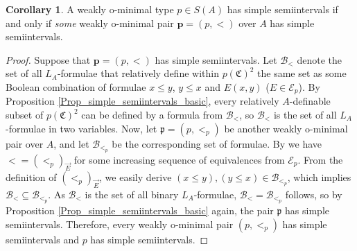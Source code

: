 \documentclass{amsart}
\theoremstyle{definition}
\newtheorem{Corollary}[Theorem]{Corollary}
\theoremstyle{definition}
\newcommand{\Mon}{\mathfrak C}
\begin{document}
\begin{Corollary}\label{COr_simple_semiint_ind_of order}
A weakly o-minimal type $p\in S(A)$ has simple semiintervals if and only if    {\it some} weakly o-minimal pair $\mathbf p=(p,<)$ over $A$ has simple semiintervals. 
\end{Corollary}
\begin{proof}Suppose that $\mathbf p=(p,<)$ has simple semiintervals. Let $\mathcal B_{<}$ denote the set of all $L_A$-formulae that relatively define within $p(\Mon)^2$ the same set as some Boolean combination of formulae $x\leqslant y$, $y\leqslant x$ and $E(x,y)$ ($E\in\mathcal E_p$). 
By Proposition \ref{Prop_simple_semiintervals_basic}, every relatively $A$-definable subset of $p(\Mon)^2$ can be defined by a formula from $\mathcal B_{<}$, so $\mathcal B_{<}$ is the set of all $L_A$-formulae in two variables. 
Now, let $\mathfrak p=(p,<_p)$ be another weakly o-minimal pair over $A$, and let $\mathcal B_{<_p}$ be the corresponding set of formulae.
By \cite[Theorem 4.2]{MTwom} we have $<=(<_p)_{\vec E}$ for some increasing sequence of equivalences from $\mathcal E_p$. From the definition of $(<_p)_{\vec E}$, we easily derive
$(x\leqslant y), (y\leqslant x)\in \mathcal B_{<_p}$, which implies $\mathcal B_<\subseteq \mathcal B_{<_p}$. As $\mathcal B_<$ is the set of all binary $L_A$-formulae, $\mathcal B_<=\mathcal B_{<_p}$ follows, so by Proposition \ref{Prop_simple_semiintervals_basic} again, the pair $\mathfrak p$ has simple semiintervals. Therefore, every weakly o-minimal pair $(p,<_p)$ has simple semiintervals and $p$ has simple semiintervals. 
\end{proof}
\end{document}
